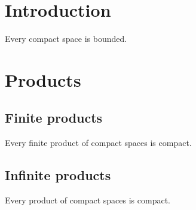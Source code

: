 \documentclass{journal}
\begin{document}
\section{Introduction}
\begin{theorem} Every compact space is bounded. \end{theorem}
\section{Products}
\subsection{Finite products}
\begin{lemma} Every finite product of compact spaces is compact. \end{lemma}
\subsection{Infinite products}
\begin{theorem} Every product of compact spaces is compact. \end{theorem}
\end{document}
